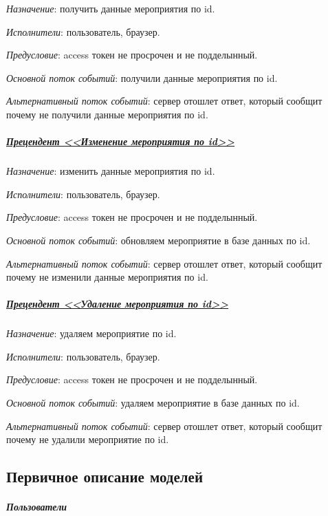 \textit{Назначение}: получить данные мероприятия по id.

\textit{Исполнители}: пользователь, браузер.

\textit{Предусловие}: access токен не просрочен и не подделынный.

\textit{Основной поток событий}: получили данные мероприятия по id.

\textit{Альтернативный поток событий}: сервер отошлет ответ, который сообщит почему не получили данные мероприятия по id.


\subparagraph{\underline{Прецендент <<Изменение мероприятия по id>>}} \hspace{0pt}

\textit{Назначение}: изменить данные мероприятия по id.

\textit{Исполнители}: пользователь, браузер.

\textit{Предусловие}: access токен не просрочен и не подделынный.

\textit{Основной поток событий}: обновляем мероприятие в базе данных по id.

\textit{Альтернативный поток событий}: сервер отошлет ответ, который сообщит почему не изменили данные мероприятия по id.


\subparagraph{\underline{Прецендент <<Удаление мероприятия по id>>}} \hspace{0pt}

\textit{Назначение}: удаляем мероприятие по id.

\textit{Исполнители}: пользователь, браузер.

\textit{Предусловие}: access токен не просрочен и не подделынный.

\textit{Основной поток событий}: удаляем мероприятие в базе данных по id.

\textit{Альтернативный поток событий}: сервер отошлет ответ, который сообщит почему не удалили мероприятие по id.


\newpage
\subsection{Первичное описание моделей}

\subparagraph{Пользователи} \hspace{0pt}

